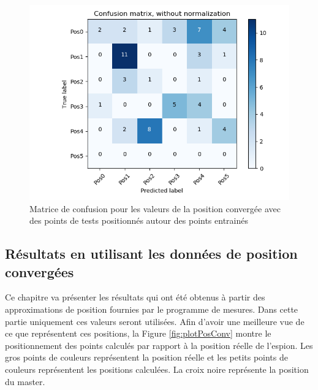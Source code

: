 \begin{figure}[htp]
 \begin{center}
  \includegraphics[scale=0.5]{figures/mat_pos_Tx.png}
  \caption{Matrice de confusion pour les valeurs de la position convergée avec des points de tests positionnés autour des points entrainés}
  \label{fig:matPosTx} %
 \end{center}
\end{figure}

\subsection{Résultats en utilisant les données de position convergées}
Ce chapitre va présenter les résultats qui ont été obtenus à partir des approximations de position fournies par le programme de mesures. Dans cette partie uniquement ces valeurs seront utilisées. Afin d'avoir une meilleure vue de ce que représentent ces positions, la Figure \ref{fig:plotPosConv} montre le positionnement des points calculés par rapport à la position réelle de l'espion. Les gros points de couleurs représentent la position réelle et les petits points de couleurs représentent les positions calculées. La croix noire représente la position du master. 

